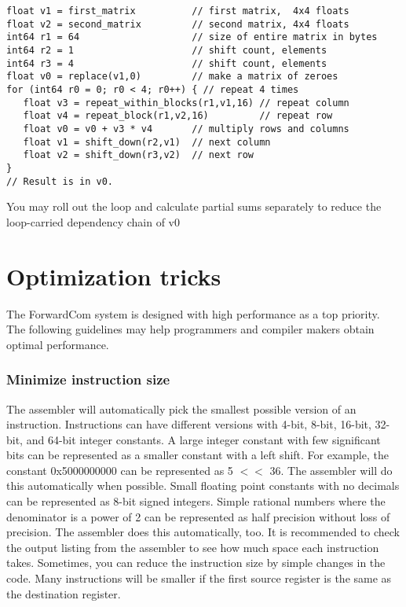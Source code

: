 \documentclass[forwardcom.tex]{subfiles}
\begin{document}
\begin{example}
\label{exampleMatrixMultiplication}
\end{example}
\begin{lstlisting}[frame=single]
float v1 = first_matrix          // first matrix,  4x4 floats
float v2 = second_matrix         // second matrix, 4x4 floats
int64 r1 = 64                    // size of entire matrix in bytes
int64 r2 = 1                     // shift count, elements
int64 r3 = 4                     // shift count, elements
float v0 = replace(v1,0)         // make a matrix of zeroes
for (int64 r0 = 0; r0 < 4; r0++) { // repeat 4 times
   float v3 = repeat_within_blocks(r1,v1,16) // repeat column
   float v4 = repeat_block(r1,v2,16)         // repeat row
   float v0 = v0 + v3 * v4       // multiply rows and columns
   float v1 = shift_down(r2,v1)  // next column
   float v2 = shift_down(r3,v2)  // next row
}
// Result is in v0.
\end{lstlisting}
\vspace{2mm}
You may roll out the loop and calculate partial sums separately to
reduce the loop-carried dependency chain of v0
\vspace{2mm}



\section{Optimization tricks}
\label{OptimizationTricks}

The ForwardCom system is designed with high performance as a top priority. The following guidelines may help programmers and compiler makers obtain optimal performance.

\subsubsection{Minimize instruction size}
The assembler will automatically pick the smallest possible version of an instruction. 
Instructions can have different versions with 4-bit, 8-bit, 16-bit, 32-bit, and 64-bit integer constants. 
A large integer constant with few significant bits can be represented as a smaller constant with a left shift. For example, the constant 0x5000000000 can be represented as 5 $<<$ 36. The assembler will do this automatically when possible.
Small floating point constants with no decimals can be represented as 8-bit signed integers. Simple rational numbers where the denominator is a power of 2 can be represented as half precision without loss of precision. The assembler does this automatically, too.
It is recommended to check the output listing from the assembler to see 
how much space each instruction takes. Sometimes, you can reduce the instruction size by simple changes in the code. Many instructions will be smaller if the first source register is the same as the destination register. 
\end{document}
